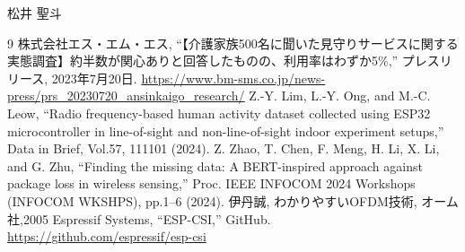 \documentclass[uplatex, 12pt]{ujbook}
\begin{document}
松井 聖斗


\begin{thebibliography}{9}
株式会社エス・エム・エス, ``【介護家族500名に聞いた見守りサービスに関する実態調査】約半数が関心ありと回答したものの、利用率はわずか5\%,'' プレスリリース, 2023年7月20日.
\url{https://www.bm-sms.co.jp/news-press/prs_20230720_ansinkaigo_research/}
Z.-Y. Lim, L.-Y. Ong, and M.-C. Leow, ``Radio frequency-based human activity dataset collected using ESP32 microcontroller in line-of-sight and non-line-of-sight indoor experiment setups,''
Data in Brief, Vol.57, 111101 (2024).
Z. Zhao, T. Chen, F. Meng, H. Li, X. Li, and G. Zhu, ``Finding the missing data: A BERT-inspired approach against package loss in wireless sensing,''
Proc. IEEE INFOCOM 2024 Workshops (INFOCOM WKSHPS), pp.1--6 (2024).
伊丹誠, わかりやすいOFDM技術, オーム社,2005
Espressif Systems, ``ESP-CSI,'' GitHub.
\url{https://github.com/espressif/esp-csi} 

\end{thebibliography}
\end{document}
